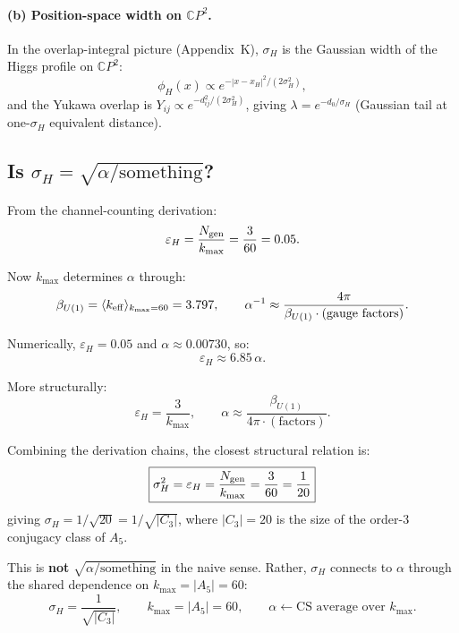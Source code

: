 \documentclass[11pt]{article}
\newcommand{\CP}{\mathbb{C}P}
\theoremstyle{remark}
\begin{document}
\paragraph{(b) Position-space width on $\CP^2$.}
In the overlap-integral picture (Appendix~K), $\sigma_H$ is the
Gaussian width of the Higgs profile on $\CP^2$:
\begin{equation}
\phi_H(x) \propto e^{-|x-x_H|^2/(2\sigma_H^2)},
\end{equation}
and the Yukawa overlap is $Y_{ij} \propto e^{-d_{ij}^2/(2\sigma_H^2)}$,
giving $\lambda = e^{-d_0/\sigma_H}$ (Gaussian tail at one-$\sigma_H$
equivalent distance).

\subsection{Is $\sigma_H = \sqrt{\alpha/\text{something}}$?}

From the channel-counting derivation:
\begin{equation}
\varepsilon_H = \frac{N_{\rm gen}}{k_{\max}} = \frac{3}{60} = 0.05.
\end{equation}

Now $k_{\max}$ determines $\alpha$ through:
\begin{equation}
\beta_{U(1)} = \langle k_{\rm eff} \rangle_{k_{\max}=60} = 3.797, \qquad
\alpha^{-1} \approx \frac{4\pi}{\beta_{U(1)} \cdot (\text{gauge factors})}.
\end{equation}

Numerically, $\varepsilon_H = 0.05$ and $\alpha \approx 0.00730$, so:
\begin{equation}
\varepsilon_H \approx 6.85 \,\alpha.
\end{equation}

More structurally:
\begin{equation}
\varepsilon_H = \frac{3}{k_{\max}}, \qquad
\alpha \approx \frac{\beta_{U(1)}}{4\pi \cdot (\text{factors})}.
\end{equation}

\begin{tcolorbox}[colback=yellow!5!white, colframe=yellow!60!black,
  title=Candidate Relation]
Combining the derivation chains, the closest structural relation is:
\begin{equation}
\boxed{\sigma_H^2 = \varepsilon_H = \frac{N_{\rm gen}}{k_{\max}} = \frac{3}{60} = \frac{1}{20}}
\end{equation}
giving $\sigma_H = 1/\sqrt{20} = 1/\sqrt{|C_3|}$, where $|C_3| = 20$
is the size of the order-3 conjugacy class of $A_5$.

This is \textbf{not} $\sqrt{\alpha/\text{something}}$ in the naive sense.
Rather, $\sigma_H$ connects to $\alpha$ through the shared dependence
on $k_{\max} = |A_5| = 60$:
\begin{equation}
\sigma_H = \frac{1}{\sqrt{|C_3|}}, \qquad
k_{\max} = |A_5| = 60, \qquad
\alpha \leftarrow \text{CS average over } k_{\max}.
\end{equation}
\end{tcolorbox}
\end{document}
